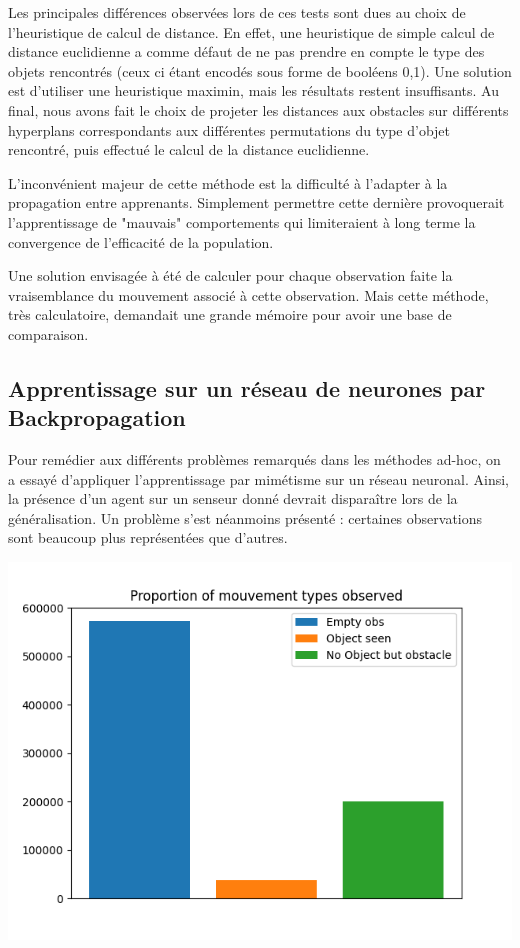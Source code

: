 \documentclass[a4paper, 12pt]{report}
\begin{document}
Les principales différences observées lors de ces tests sont dues au choix de l'heuristique de calcul de distance. En effet, une heuristique de simple calcul de distance euclidienne a comme défaut de ne pas prendre en compte le type des objets rencontrés (ceux ci étant encodés sous forme de booléens 0,1). Une solution est d'utiliser une heuristique maximin, mais les résultats restent insuffisants.
Au final, nous avons fait le choix de projeter les distances aux obstacles sur différents hyperplans correspondants aux différentes permutations du type d'objet rencontré, puis effectué le calcul de la distance euclidienne.

L'inconvénient majeur de cette méthode est la difficulté à l'adapter à la propagation entre apprenants. Simplement permettre cette dernière provoquerait l'apprentissage de "mauvais" comportements qui limiteraient à long terme la convergence de l'efficacité de la population.

Une solution envisagée à été de calculer pour chaque observation faite la vraisemblance du mouvement associé à cette observation. Mais cette méthode, très calculatoire, demandait une grande mémoire pour avoir une base de comparaison.
	
	\subsection{Apprentissage sur un réseau de neurones par Backpropagation}
	Pour remédier aux différents problèmes remarqués dans les méthodes ad-hoc, on a essayé d'appliquer l'apprentissage par mimétisme sur un réseau neuronal. Ainsi, la présence d'un agent sur un senseur donné devrait disparaître lors de la généralisation.
	Un problème s'est néanmoins présenté : certaines observations sont beaucoup plus représentées que d'autres.
	
\begin{center}
\includegraphics[scale = 0.5]{Proportions}
\end{center}	
\end{document}
